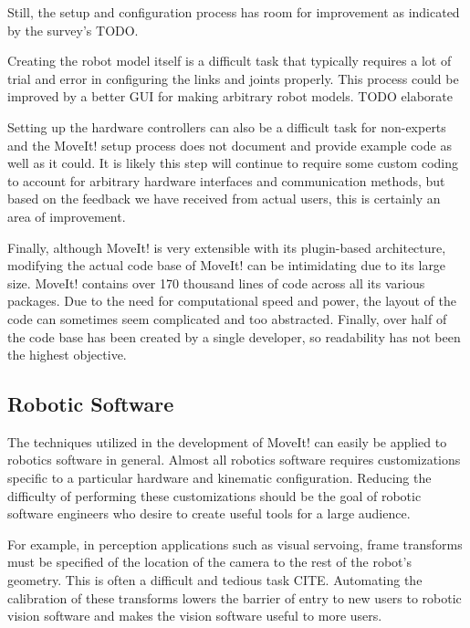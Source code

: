 \documentclass[10pt,journal,compsoc]{joser1}
\begin{document}
{Still, the setup and configuration process has room for improvement as indicated by the survey's TODO. 

Creating the robot model itself is a difficult task that typically requires a lot of trial and error in configuring the links and joints properly. This process could be improved by a better GUI for making arbitrary robot models. TODO elaborate 

Setting up the hardware controllers can also be a difficult task for non-experts and the MoveIt! setup process does not document and provide example code as well as it could. It is likely this step will continue to require some custom coding to account for arbitrary hardware interfaces and communication methods, but based on the feedback we have received from actual users, this is certainly an area of improvement. 



Finally, although MoveIt! is very extensible with its plugin-based architecture, modifying the actual code base of MoveIt! can be intimidating due to its large size. MoveIt! contains over 170 thousand lines of code across all its various packages. Due to the need for computational speed and power, the layout of the code can sometimes seem complicated and too abstracted. Finally, over half of the code base has been created by a single developer, so readability has not been the highest objective. 

\subsection{Robotic Software}
\label{sec::robotic_discussion}

The techniques utilized in the development of MoveIt! can easily be applied to robotics software in general. Almost all robotics software requires customizations specific to a particular hardware and kinematic configuration. Reducing the difficulty of performing these customizations should be the goal of robotic software engineers who desire to create useful tools for a large audience. 

For example, in perception applications such as visual servoing, frame transforms must be specified of the location of the camera to the rest of the robot's geometry. This is often a difficult and tedious task CITE. Automating the calibration of these transforms lowers the barrier of entry to new users to robotic vision software and makes the vision software useful to more users.

}
\end{document}
